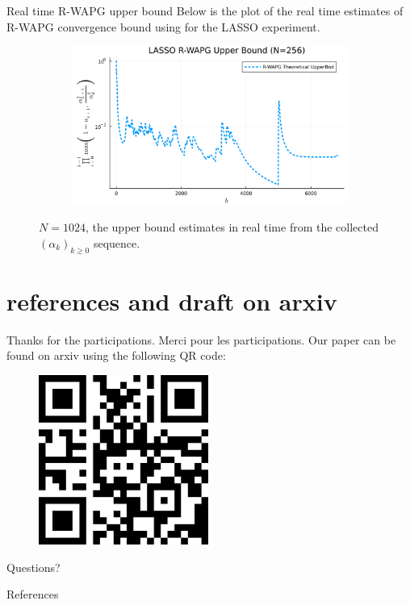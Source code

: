 \documentclass[11pt]{beamer}
\theoremstyle{definition}
\begin{document}
        \begin{frame}{Real time R-WAPG upper bound}
            Below is the plot of the real time estimates of R-WAPG convergence bound using for the LASSO experiment. 
            \begin{figure}[H]
                \centering
                \begin{subfigure}[b]{0.75\textwidth}
                    \centering
                    \includegraphics[width=\textwidth]{
                        assets/lasso_rwapg_upperbnd_256.png
                    }
                \end{subfigure}
                \caption{
                    $N = 1024$, the upper bound estimates in real time from the collected $(\alpha_k)_{k \ge 0}$ sequence. 
                }
                \label{fig:single-lass-r-wapg-rwapg-upperbnd}
            \end{figure}
        \end{frame}



\section{references and draft on arxiv}
    \begin{frame}{Thanks for the participations. Merci pour les participations.}
        Our paper can be found on arxiv using the following QR code: 
        \begin{figure}
            \centering
            \includegraphics[width=15em]{assets/paper-qrcode.png}
        \end{figure}
        Questions?
    \end{frame}
    \begin{frame}{References}        
        
    \end{frame}
\end{document}
